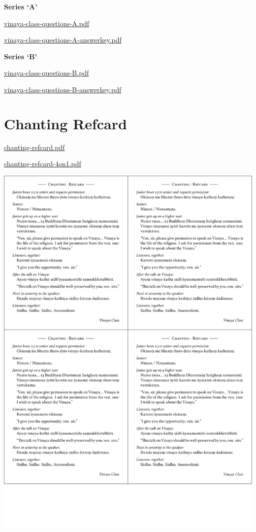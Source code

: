 \textbf{Series `A'}

\href{./includes/docs/vinaya-class-questions-A.pdf}{vinaya-class-questions-A.pdf}

\href{./includes/docs/vinaya-class-questions-A-answerkey.pdf}{vinaya-class-questions-A-answerkey.pdf}

\textbf{Series `B'}

\href{./includes/docs/vinaya-class-questions-B.pdf}{vinaya-class-questions-B.pdf}

\href{./includes/docs/vinaya-class-questions-B-answerkey.pdf}{vinaya-class-questions-B-answerkey.pdf}

\section{Chanting Refcard}

\href{./includes/docs/chanting-refcard.pdf}{chanting-refcard.pdf}

\href{./includes/docs/chanting-refcard-4on1.pdf}{chanting-refcard-4on1.pdf}

\href{./includes/docs/chanting-refcard-4on1.pdf}{\includegraphics{./includes/docs/chanting-refcard-4on1-thumb.png}}

